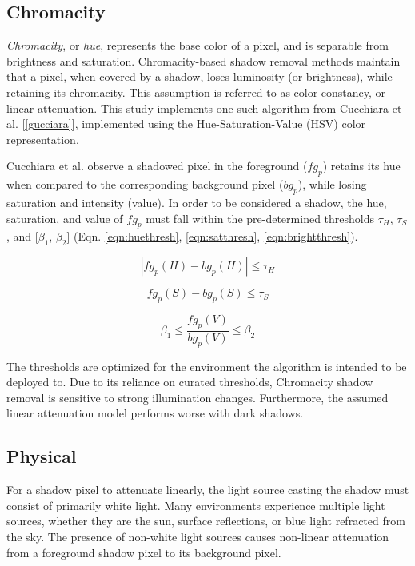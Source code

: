\subsection{Chromacity}

\textit{Chromacity}, or \textit{hue}, represents the base color of a pixel, and is separable from brightness and saturation. Chromacity-based shadow removal methods maintain that a pixel, when covered by a shadow, loses luminosity (or brightness), while retaining its chromacity. This assumption is referred to as  color constancy, or linear attenuation. This study implements one such algorithm from Cucchiara et al. [\ref{gucciara}], implemented using the Hue-Saturation-Value (HSV) color representation. 

Cucchiara et al. observe a shadowed pixel in the foreground ($fg_{p}$) retains its hue when compared to the corresponding background pixel ($bg_{p}$), while losing saturation and intensity (value). In order to be considered a shadow, the hue, saturation, and value of $fg_{p}$ must fall within the pre-determined thresholds $\tau_{H}$, $\tau_{S}$, and [$\beta_{1}$, $\beta_{2}$] (Eqn. \ref{eqn:huethresh}, \ref{eqn:satthresh}, \ref{eqn:brightthresh}).

\begin{equation} \label{eqn:huethresh}
| fg_{p}(H) - bg_{p}(H) | \leq \tau_{H}
\end{equation}

\begin{equation} \label{eqn:satthresh}
fg_{p}(S) - bg_{p}(S) \leq \tau_{S}
\end{equation}

\begin{equation} \label{eqn:brightthresh}
\beta_{1} \leq \dfrac{fg_{p}(V)}{bg_{p}(V)} \leq \beta_{2}
\end{equation}

The thresholds are optimized for the environment the algorithm is intended to be deployed to. Due to its reliance on curated thresholds, Chromacity shadow removal is sensitive to strong illumination changes. Furthermore, the assumed linear attenuation model performs worse with dark shadows. 

\subsection{Physical}

For a shadow pixel to attenuate linearly, the light source casting the shadow must consist of primarily white light. Many environments experience multiple light sources, whether they are the sun, surface reflections, or blue light refracted from the sky. The presence of non-white light sources causes non-linear attenuation from a foreground shadow pixel to its background pixel.

